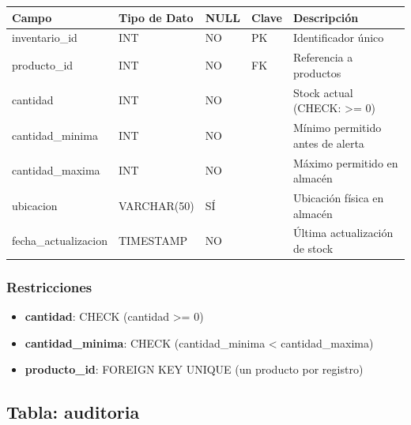 \begin{center}
\begin{tabular}{|l|l|l|l|p{4cm}|}
    \hline
    \textbf{Campo} & \textbf{Tipo de Dato} & \textbf{NULL} & \textbf{Clave} & \textbf{Descripción} \\
    \hline
    inventario_id & INT & NO & PK & Identificador único \\
    \hline
    producto_id & INT & NO & FK & Referencia a productos \\
    \hline
    cantidad & INT & NO & & Stock actual (CHECK: >= 0) \\
    \hline
    cantidad_minima & INT & NO & & Mínimo permitido antes de alerta \\
    \hline
    cantidad_maxima & INT & NO & & Máximo permitido en almacén \\
    \hline
    ubicacion & VARCHAR(50) & SÍ & & Ubicación física en almacén \\
    \hline
    fecha_actualizacion & TIMESTAMP & NO & & Última actualización de stock \\
    \hline
\end{tabular}
\end{center}

\subsubsection{Restricciones}
\begin{itemize}
    \item \textbf{cantidad}: CHECK (cantidad >= 0)
    \item \textbf{cantidad\_minima}: CHECK (cantidad\_minima < cantidad\_maxima)
    \item \textbf{producto\_id}: FOREIGN KEY UNIQUE (un producto por registro)
\end{itemize}


\subsection{Tabla: auditoria}

